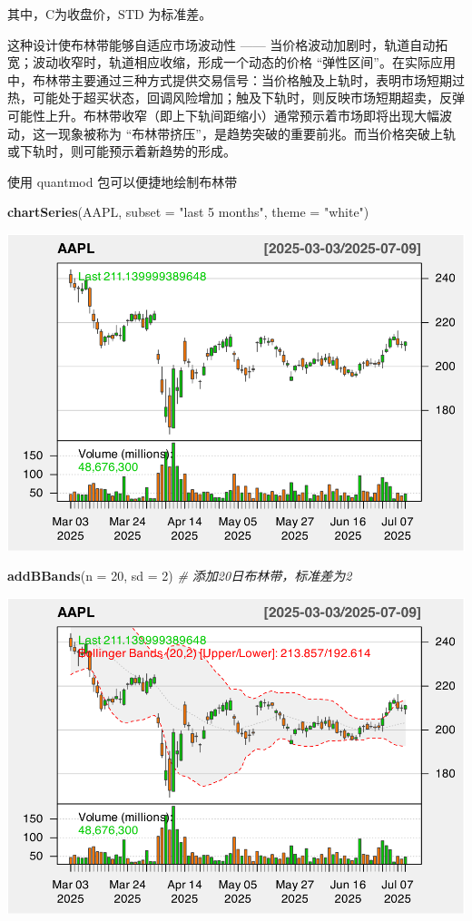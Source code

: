 \documentclass[]{ctexbook}
\newenvironment{Shaded}{\begin{snugshade}}{\end{snugshade}}
\newcommand{\AttributeTok}[1]{\textcolor[rgb]{0.13,0.29,0.53}{#1}}
\newcommand{\CommentTok}[1]{\textcolor[rgb]{0.56,0.35,0.01}{\textit{#1}}}
\newcommand{\DecValTok}[1]{\textcolor[rgb]{0.00,0.00,0.81}{#1}}
\newcommand{\FunctionTok}[1]{\textcolor[rgb]{0.13,0.29,0.53}{\textbf{#1}}}
\newcommand{\NormalTok}[1]{#1}
\newcommand{\StringTok}[1]{\textcolor[rgb]{0.31,0.60,0.02}{#1}}
\begin{document}
其中，C为收盘价，\(\text{STD}\) 为标准差。

这种设计使布林带能够自适应市场波动性 ------ 当价格波动加剧时，轨道自动拓宽；波动收窄时，轨道相应收缩，形成一个动态的价格 ``弹性区间''。在实际应用中，布林带主要通过三种方式提供交易信号：当价格触及上轨时，表明市场短期过热，可能处于超买状态，回调风险增加；触及下轨时，则反映市场短期超卖，反弹可能性上升。布林带收窄（即上下轨间距缩小）通常预示着市场即将出现大幅波动，这一现象被称为 ``布林带挤压''，是趋势突破的重要前兆。而当价格突破上轨或下轨时，则可能预示着新趋势的形成。

使用 quantmod 包可以便捷地绘制布林带

\begin{Shaded}
\begin{Highlighting}[]
\FunctionTok{chartSeries}\NormalTok{(AAPL, }\AttributeTok{subset =} \StringTok{"last 5 months"}\NormalTok{, }\AttributeTok{theme =} \StringTok{"white"}\NormalTok{)  }
\end{Highlighting}
\end{Shaded}

\includegraphics[width=0.9\linewidth]{quantmod_files/figure-latex/bb-1}

\begin{Shaded}
\begin{Highlighting}[]
\FunctionTok{addBBands}\NormalTok{(}\AttributeTok{n =} \DecValTok{20}\NormalTok{, }\AttributeTok{sd =} \DecValTok{2}\NormalTok{)  }\CommentTok{\# 添加20日布林带，标准差为2  }
\end{Highlighting}
\end{Shaded}

\includegraphics[width=0.9\linewidth]{quantmod_files/figure-latex/bb-2}
\end{document}
